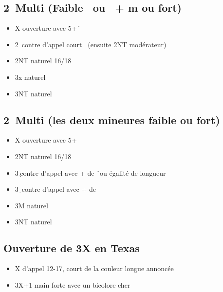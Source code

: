 \documentclass[a4paper]{article}
\begin{document}
\subsection{2\pdfh\ Multi (Faible \pdfs\ ou \pdfs\ + m ou fort)}

\begin{itemize}
\item X ouverture avec 5+\h\ 

\item 2\s\ contre d'appel court \s\ (ensuite 2NT modérateur)

\item 2NT naturel 16/18

\item 3x naturel

\item 3NT naturel

\end{itemize}

\subsection{2\pdfs\ Multi (les deux mineures faible ou fort)}

\begin{itemize}
\item X ouverture avec 5+\s\ 

\item 2NT naturel 16/18

\item 3\c\ contre d'appel avec + de \h\ ou égalité de longueur

\item 3\d\ contre d'appel avec + de \s\ 

\item 3M naturel

\item 3NT naturel

\end{itemize}

\subsection{Ouverture de 3X en Texas}

\begin{itemize}
\item X d'appel 12-17, court de la couleur longue annoncée

\item 3X+1 main forte avec un bicolore cher

\end{itemize}
\end{document}
